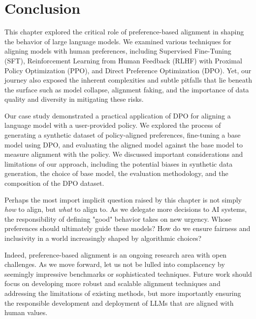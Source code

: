 \section{Conclusion}
This chapter explored the critical role of preference-based alignment in shaping the behavior of large language models. We examined various techniques for aligning models with human preferences, including Supervised Fine-Tuning (SFT), Reinforcement Learning from Human Feedback (RLHF) with Proximal Policy Optimization (PPO), and Direct Preference Optimization (DPO). Yet, our journey also exposed the inherent complexities and subtle pitfalls that lie beneath the surface such as model collapse, alignment faking, and the importance of data quality and diversity in mitigating these risks.

Our case study demonstrated a practical application of DPO for aligning a language model with a user-provided policy. We explored the process of generating a synthetic dataset of policy-aligned preferences, fine-tuning a base model using DPO, and evaluating the aligned model against the base model to measure alignment with the policy. We discussed important considerations and limitations of our approach, including the potential biases in synthetic data generation, the choice of base model, the evaluation methodology, and the composition of the DPO dataset.

Perhaps the most import implicit question raised by this chapter is not simply \textit{how} to align, but \textit{what} to align to. As we delegate more decisions to AI systems, the responsibility of defining "good" behavior takes on new urgency.  Whose preferences should ultimately guide these models? How do we ensure fairness and inclusivity in a world increasingly shaped by algorithmic choices?

Indeed, preference-based alignment is an ongoing research area with open challenges. As we move forward, let us not be lulled into complacency by seemingly impressive benchmarks or sophisticated techniques. Future work should focus on developing more robust and scalable alignment techniques and addressing the limitations of existing methods, but more importantly ensuring the responsible development and deployment of LLMs that are aligned with human values.
